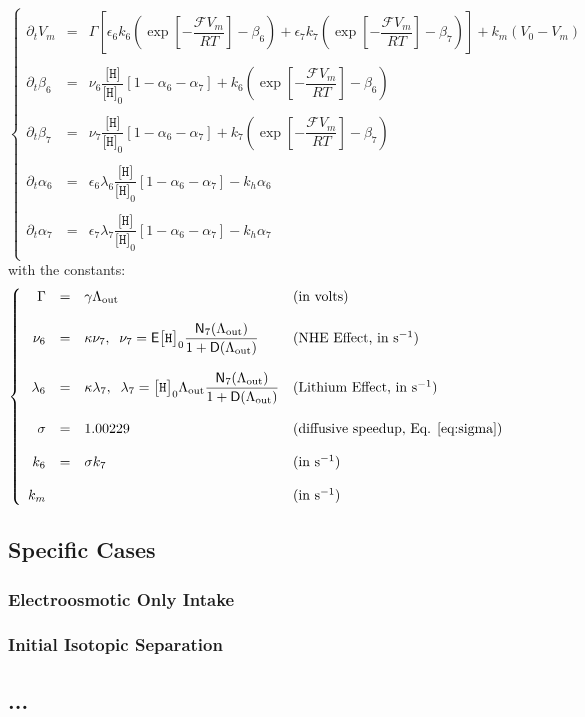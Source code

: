 \documentclass[aps,onecolumn,11pt]{revtex4}
\newcommand{\mychem}[1]{\mathtt{#1}}
\newcommand{\myconc}[1]{\big[#1\big]}
\newcommand{\Faraday}{\mathcal{F}}
\newcommand{\spproton}{\mychem{H}}
\newcommand{\proton}{\myconc{\spproton}}
\newcommand{\myout}[1]{{#1}_{\mathrm{out}}}
\newcommand{\LiAll}{\Lambda}
\newcommand{\LiAllOut}{\myout{\LiAll}}
\begin{document}
\begin{equation}
\left\lbrace
\begin{array}{rcl}
\partial_t V_m & = & \Gamma \left[ \epsilon_6 k_6 \left(\exp\left[ -\dfrac{\Faraday V_m}{RT} \right] - \beta_6\right) + \epsilon_7 k_7 \left(\exp\left[ -\dfrac{\Faraday V_m}{RT} \right] - \beta_7\right)\right] + k_m \left(V_0 - V_m\right)\\
\\
\partial_t \beta_6 & = & \nu_6 \dfrac{\proton}{\proton_0} \left[ 1-\alpha_6-\alpha_7\right] + k_6 \left(\exp\left[ -\dfrac{\Faraday V_m}{RT} \right] - \beta_6\right) \\
\\
\partial_t \beta_7 & = & \nu_7 \dfrac{\proton}{\proton_0} \left[ 1-\alpha_6-\alpha_7\right] + k_7 \left(\exp\left[ -\dfrac{\Faraday V_m}{RT} \right] - \beta_7\right) \\
\\
\partial_t \alpha_6 & = & \epsilon_6 \lambda_6  \dfrac{\proton}{\proton_0}\left[ 1-\alpha_6-\alpha_7\right] - k_h \alpha_6\\
\\
\partial_t \alpha_7 & = & \epsilon_7 \lambda_7  \dfrac{\proton}{\proton_0} \left[ 1-\alpha_6-\alpha_7\right] - k_h \alpha_7\\
\end{array}
\right.
\end{equation}
with the constants:
\begin{equation}
\left\lbrace
\begin{array}{rcll}
\Gamma & = & \gamma \LiAllOut & \text{(in volts)}\\
\\
\nu_6 & = & \kappa \nu_7, \;\; \nu_7  =  \mathsf{E}\proton_0 \dfrac{\mathsf{N}_7(\LiAllOut)}{1+\mathsf{D}(\LiAllOut)} & \text{(NHE Effect, in s$^{-1}$)}\\
\\
\lambda_6 & = & \kappa \lambda_7, \;\; \lambda_7  =  \proton_0 \LiAllOut \dfrac{\mathsf{N}_7(\LiAllOut)}{1+\mathsf{D}(\LiAllOut)} & \text{(Lithium Effect, in s$^{-1}$)}\\
\\
\sigma    & = & 1.00229 & \text{(diffusive speedup, Eq. \eqref{eq:sigma})}\\
\\
k_6 & = & \sigma k_7 & \text{(in s$^{-1}$)}\\
\\
k_m &  & & \text{(in s$^{-1}$)}\\
\end{array}
\right.
\end{equation}

\subsection{Specific Cases}

\subsubsection{Electroosmotic Only Intake}

\subsubsection{Initial Isotopic Separation}



\subsection{...}
\end{document}
